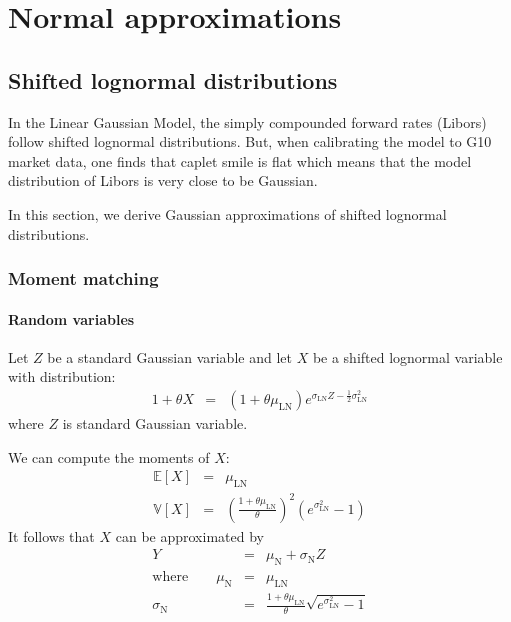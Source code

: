 \documentclass[11pt,english]{amsart}
\newcommand{\EE}{\mathbb{E}}
\newcommand{\VV}{\mathbb{V}}
\theoremstyle{definition}
\begin{document}
\newpage%
\section{Normal approximations}

\subsection{Shifted lognormal distributions}
In the Linear Gaussian Model, the simply compounded forward rates (Libors) follow shifted lognormal distributions. But, when calibrating the model to G10 market data, one finds that caplet smile is flat which means that the model distribution of Libors is very close to be Gaussian. 

In this section, we derive Gaussian approximations of shifted lognormal distributions.  

\subsubsection{Moment matching}

\paragraph{Random variables}

Let $Z$ be a standard Gaussian variable and let $X$ be a shifted lognormal variable with distribution:
\begin{eqnarray}
  1 + \theta X &=& (1+\theta \mu_{\mathrm{LN}} )e^{\sigma_{\mathrm{LN}} Z - \frac{1}{2}\sigma_{\mathrm{LN}}^2} 
\end{eqnarray}
where $Z$ is standard Gaussian variable. 

We can compute the moments of $X$: 
\begin{eqnarray}
  \EE[X] &=& \mu_{\mathrm{LN}} \\ 
  \VV[X] &=& \left(\frac{1+\theta \mu_{\mathrm{LN}}}{\theta}\right)^2 \left( e^{\sigma_{\mathrm{LN}}^2} - 1 \right) 
\end{eqnarray}
It follows that $X$ can be approximated by 
\begin{eqnarray}
  Y &=& \mu_{\mathrm{N}} +  \sigma_{\mathrm{N}}Z \\
  \textrm{where} \qquad \mu_{\mathrm{N}} &=& \mu_{\mathrm{LN}} \\ 
  \sigma_{\mathrm{N}} &=& \frac{1+\theta \mu_{\mathrm{LN}}}{\theta} \sqrt{e^{\sigma_{\mathrm{LN}}^2} - 1}
\end{eqnarray}
\end{document}
